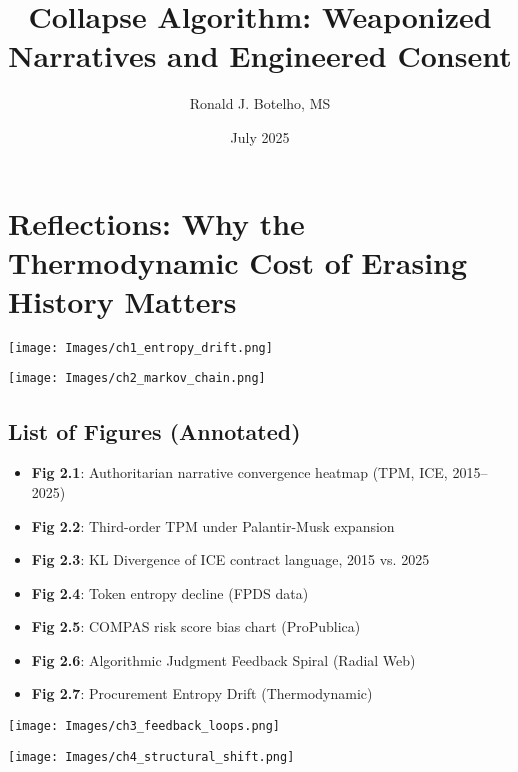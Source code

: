 \documentclass[12pt]{book}
\title{Collapse Algorithm: Weaponized Narratives and Engineered Consent}
\author{Ronald J. Botelho, MS}
\date{July 2025}
\begin{document}
\maketitle

\frontmatter


\chapter*{Reflections: Why the Thermodynamic Cost of Erasing History Matters}




\newpage
\tableofcontents
\listoffigures
\clearpage

\mainmatter


\texttt{[image: Images/ch1\_entropy\_drift.png]}


\texttt{[image: Images/ch2\_markov\_chain.png]}
\section*{List of Figures (Annotated)}
\begin{itemize}
  \item \textbf{Fig 2.1}: Authoritarian narrative convergence heatmap (TPM, ICE, 2015–2025)
  \item \textbf{Fig 2.2}: Third-order TPM under Palantir-Musk expansion
  \item \textbf{Fig 2.3}: KL Divergence of ICE contract language, 2015 vs. 2025
  \item \textbf{Fig 2.4}: Token entropy decline (FPDS data)
  \item \textbf{Fig 2.5}: COMPAS risk score bias chart (ProPublica)
  \item \textbf{Fig 2.6}: Algorithmic Judgment Feedback Spiral (Radial Web)
  \item \textbf{Fig 2.7}: Procurement Entropy Drift (Thermodynamic)
\end{itemize}

\texttt{[image: Images/ch3\_feedback\_loops.png]}


\texttt{[image: Images/ch4\_structural\_shift.png]}
\end{document}
